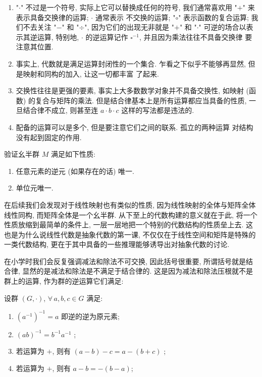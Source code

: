 \documentclass[UTF8]{book}
\begin{document}
\begin{remark}
    \begin{enumerate}[1)]
        \item "$\cdot$" 不过是一个符号, 实际上它可以替换成任何的符号, 
        我们通常喜欢用 "$+$" 来表示具备交换律的运算; $\cdot$ 通常表示
        不交换的运算; "$\circ$" 表示函数的复合运算; 
        我们不去关注 "$-$" 和 "$\div$", 因为它们的出现无非就是 "$+$" 
        和 "$\cdot$" 可逆的场合以表示其逆运算, 特别地, $\cdot$ 
        的逆运算记作 $\square^{-1}$, 并且因为乘法往往不具备交换律
        要注意其位置.

        \item 事实上, 代数就是满足运算封闭性的一个集合. 
        乍看之下似乎不能够再显然, 但是映射和同构的加入, 让这一切都丰富
        了起来. 

        \item 交换性往往是更强的要素, 事实上大多数数学对象并不具备交换性, 
        如映射 (函数) 的复合与矩阵的乘法. 
        但是结合律基本上是所有运算都应当具备的性质, 
        一旦结合律不成立, 则甚至连 $a\cdot b \cdot c$ 这样的写法都是违法的. 

        \item 配备的运算可以是多个, 但是要注意它们之间的联系. 孤立的两种运算
        对结构没有起到固定的作用. 
        
    \end{enumerate}
\end{remark}

\begin{exercise}
    验证幺半群 $M$ 满足如下性质: 
    \begin{enumerate}[(1)]
        \item 任意元素的逆元 (如果存在的话) 唯一. 
        \item 单位元唯一. 
    \end{enumerate}
\end{exercise}

在后续我们会发现对于线性映射也有类似的性质, 
因为线性映射的全体与矩阵全体线性同构, 
而矩阵全体是一个幺半群. 
从下至上的代数构建的意义就在于此, 将一个性质放缩到最简单的条件上, 
一层一层地把一个特别的代数结构的性质垒上去. 
这也是为什么说线性代数是抽象代数的第一课, 不仅仅在于线性空间和矩阵是特殊的
一类代数结构, 更在于其中具备的一些推理能够诱导出对抽象代数的讨论. 

在小学时我们会反复强调减法和除法不可交换, 因此括号很重要, 
所谓括号就是结合律, 显然的是减法和除法是不满足于结合律的. 
这是因为减法和除法压根就不是群上的运算, 作为群的逆运算它们满足: 
\begin{proposition}
    设群 $(G,\cdot)$, $ \forall\,a,b,c\in G $ 满足: 
    \begin{enumerate}[(1)]
        \item $ (a^{-1})^{-1} = a $ 即逆的逆为原元素; 
        \item $ (ab)^{-1} = b^{-1}a^{-1} $ ;
        \item 若运算为 $+$, 则有 $(a-b)-c = a-(b+c)$ ;
        \item 若运算为 $+$, 则有 $a-b = -(b-a)$; 
    \end{enumerate}
\end{proposition}
\end{document}
